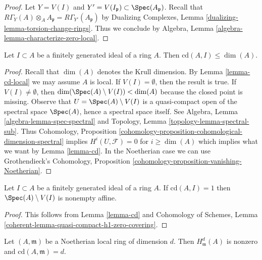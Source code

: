 \begin{proof}
Let $Y = V(I)$ and $Y' = V(I_\mathfrak p) \subset \Spec(A_\mathfrak p)$.
Recall that
$R\Gamma_Y(A) \otimes_A A_\mathfrak p = R\Gamma_{Y'}(A_\mathfrak p)$
by Dualizing Complexes, Lemma \ref{dualizing-lemma-torsion-change-rings}.
Thus we conclude by Algebra, Lemma \ref{algebra-lemma-characterize-zero-local}.
\end{proof}

\begin{lemma}
\label{lemma-cd-dimension}
Let $I \subset A$ be a finitely generated ideal of a ring $A$.
Then $\text{cd}(A, I) \leq \dim(A)$.
\end{lemma}

\begin{proof}
Recall that $\dim(A)$ denotes the Krull dimension. By
Lemma \ref{lemma-cd-local} we may assume $A$ is local.
If $V(I) = \emptyset$, then the result is true.
If $V(I) \not = \emptyset$, then
$\dim(\Spec(A) \setminus V(I)) < \dim(A)$ because
the closed point is missing. Observe that
$U = \Spec(A) \setminus V(I)$ is a quasi-compact
open of the spectral space $\Spec(A)$, hence a spectral space itself.
See Algebra, Lemma \ref{algebra-lemma-spec-spectral} and
Topology, Lemma \ref{topology-lemma-spectral-sub}.
Thus Cohomology, Proposition
\ref{cohomology-proposition-cohomological-dimension-spectral}
implies $H^i(U, \mathcal{F}) = 0$ for $i \geq \dim(A)$
which implies what we want by Lemma \ref{lemma-cd}.
In the Noetherian case we can use Grothendieck's Cohomology, Proposition
\ref{cohomology-proposition-vanishing-Noetherian}.
\end{proof}

\begin{lemma}
\label{lemma-cd-is-one}
Let $I \subset A$ be a finitely generated ideal of a ring $A$. If
$\text{cd}(A, I) = 1$ then $\Spec(A) \setminus V(I)$ is nonempty affine.
\end{lemma}

\begin{proof}
This follows from Lemma \ref{lemma-cd} and
Cohomology of Schemes, Lemma
\ref{coherent-lemma-quasi-compact-h1-zero-covering}.
\end{proof}

\begin{lemma}
\label{lemma-cd-maximal}
Let $(A, \mathfrak m)$ be a Noetherian local ring of dimension $d$.
Then $H^d_\mathfrak m(A)$ is nonzero and $\text{cd}(A, \mathfrak m) = d$.
\end{lemma}

